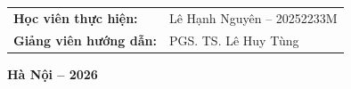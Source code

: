 \begin{titlepage}
    \begin{flushleft}
        \hspace{2.5cm} 
        \begin{tabular}{ll}
            \fontsize{12}{14}\selectfont\textbf{Học viên thực hiện:} & \fontsize{12}{14}\selectfont Lê Hạnh Nguyên -- 20252233M \\
            \fontsize{12}{14}\selectfont\textbf{Giảng viên hướng dẫn:} & \fontsize{12}{14}\selectfont PGS. TS. Lê Huy Tùng
        \end{tabular}
    \end{flushleft}
    
    \vfill
    
    {\fontsize{12}{14}\selectfont\textbf{Hà Nội -- 2026}\\}
    \vspace*{0.4cm}
    
\end{titlepage}
